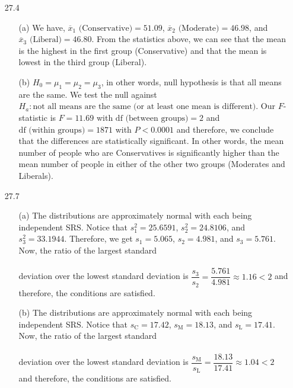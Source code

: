 \documentclass[11pt, a4paper]{article}
\begin{document}
\begin{itemize}
\item[]
\item[]

\item[27.4]
\begin{itemize}
\item[(a)]
We have, $\overline{x}_1 \text{ (Conservative)} = 51.09$,
$\overline{x}_2 \text{ (Moderate)} = 46.98$, and $\overline{x}_3 \text{ (Liberal)} = 46.80$.
From the statistics above, we can see that the mean is
the highest in the first group (Conservative) and that the mean is lowest
in the third group (Liberal).

\newpage

\item[(b)]
$H_0 = \mu_1 = \mu_2 = \mu_3$, in other words, null hypothesis
is that all means are the same. We test the null against $H_a: \text{not
all means are the same (or at least one mean is different)}$.
Our $F$-statistic is $F = 11.69$ with $\text{df (between groups)} = 2$ and $\text{df (within groups)} = 1871$
with $P < 0.0001$ and therefore, we conclude that the differences are
statistically significant. In other words, the mean number of people who are Conservatives
is significantly higher than the mean number of people in either of the other two groups (Moderates and Liberals).
\end{itemize}

\item[]
\item[]

\item[27.7]
\begin{itemize}
\item[(a)]
The distributions are approximately normal with each being independent SRS.
Notice that $s_1^2 = 25.6591$, $s_2^2 = 24.8106$, and $s_3^2 = 33.1944$.
Therefore, we get $s_1 = 5.065$, $s_2 = 4.981$, and $s_3 = 5.761$.
Now, the ratio of the largest standard\\\\
deviation over the lowest standard deviation is $\dfrac{s_3}{s_2} = \dfrac{5.761}{4.981} \approx 1.16 < 2$
and therefore, the conditions are satisfied.

\item[]

\item[(b)]
The distributions are approximately normal with each being independent SRS.
Notice that $s_\text{C} = 17.42$, $s_\text{M} = 18.13$, and $s_\text{L} = 17.41$.
Now, the ratio of the largest standard\\\\
deviation over the lowest standard deviation is $\dfrac{s_\text{M}}{s_\text{L}} = \dfrac{18.13}{17.41} \approx 1.04 < 2$
and therefore, the conditions are satisfied.
\end{itemize}


\end{itemize}
\end{document}
